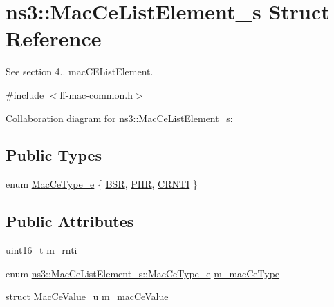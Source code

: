 \hypertarget{structns3_1_1MacCeListElement__s}{}\section{ns3\+:\+:Mac\+Ce\+List\+Element\+\_\+s Struct Reference}
\label{structns3_1_1MacCeListElement__s}


See section 4.. mac\+C\+E\+List\+Element.  




{\ttfamily \#include $<$ff-\/mac-\/common.\+h$>$}



Collaboration diagram for ns3\+:\+:Mac\+Ce\+List\+Element\+\_\+s\+:
\subsection*{Public Types}
\begin{DoxyCompactItemize}
\item 
enum \hyperlink{structns3_1_1MacCeListElement__s_a270a6526dfc7da02e9dc91823c290f6b}{Mac\+Ce\+Type\+\_\+e} \{ \hyperlink{structns3_1_1MacCeListElement__s_a270a6526dfc7da02e9dc91823c290f6bac50796b01160b1825ec34efa1ad9f051}{B\+SR}, 
\hyperlink{structns3_1_1MacCeListElement__s_a270a6526dfc7da02e9dc91823c290f6ba0526776cfb8d1b84ede6a5794a40c86d}{P\+HR}, 
\hyperlink{structns3_1_1MacCeListElement__s_a270a6526dfc7da02e9dc91823c290f6ba4e9565fdfece335117332c476e334f08}{C\+R\+N\+TI}
 \}
\end{DoxyCompactItemize}
\subsection*{Public Attributes}
\begin{DoxyCompactItemize}
\item 
uint16\+\_\+t \hyperlink{structns3_1_1MacCeListElement__s_a4fe0e279b290f76f9affb6f9d52ae239}{m\+\_\+rnti}
\item 
enum \hyperlink{structns3_1_1MacCeListElement__s_a270a6526dfc7da02e9dc91823c290f6b}{ns3\+::\+Mac\+Ce\+List\+Element\+\_\+s\+::\+Mac\+Ce\+Type\+\_\+e} \hyperlink{structns3_1_1MacCeListElement__s_a83fa13113f72a056cb5961dc5fc5e4d9}{m\+\_\+mac\+Ce\+Type}
\item 
struct \hyperlink{structns3_1_1MacCeValue__u}{Mac\+Ce\+Value\+\_\+u} \hyperlink{structns3_1_1MacCeListElement__s_a12a3485c9038cac8447c234fbaea1c3f}{m\+\_\+mac\+Ce\+Value}
\end{DoxyCompactItemize}


